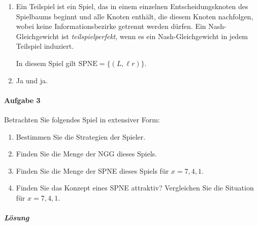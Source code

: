 \begin{enumerate}
  \item Ein Teilspiel ist ein Spiel, das in einem einzelnen Entscheidungsknoten des
    Spielbaums beginnt und alle Knoten enthält, die diesem Knoten nachfolgen, wobei keine
    Informationsbezirke getrennt werden dürfen.
    Ein Nash-Gleichgewicht ist \emph{teilspielperfekt}, wenn es ein Nash-Gleichgewicht in
    jedem Teilspiel induziert.

    In diesem Spiel gilt $\text{SPNE} = \{(L, \ell r)\}$.

  \item Ja und ja.
\end{enumerate}

\paragraph{Aufgabe 3}%
\label{par:aufgabe_3}

Betrachten Sie folgendes Spiel in extensiver Form:
\begin{center}
\end{center}

\begin{enumerate}
  \item Bestimmen Sie die Strategien der Spieler.
  \item Finden Sie die Menge der NGG dieses Spiels.
  \item Finden Sie die Menge der SPNE dieses Spiels für $x = 7,4,1$.
  \item Finden Sie das Konzept eines SPNE attraktiv?
    Vergleichen Sie die Situation für $x=7,4,1$.
\end{enumerate}

\subparagraph{Lösung}%


